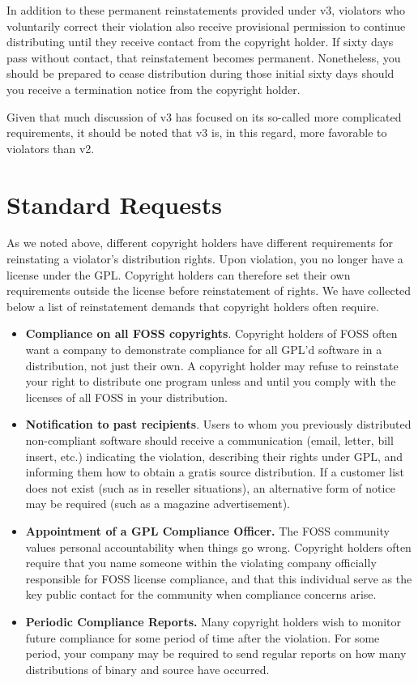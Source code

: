 \documentclass[letterpaper]{fixme}
\begin{document}
In addition to these permanent reinstatements provided under v3, violators
who voluntarily correct their violation also receive provisional
permission to continue distributing until they receive contact from the
copyright holder.  If sixty days pass without contact, that reinstatement
becomes permanent.  Nonetheless, you should be prepared to cease
distribution during those initial sixty days should you receive a
termination notice from the copyright holder.

Given that much discussion of v3 has focused on its so-called more
complicated requirements, it should be noted that v3 is, in this regard,
more favorable to violators than v2.

\section{Standard Requests}

As we noted above, different copyright holders have different requirements
for reinstating a violator's distribution rights.  Upon violation, you no
longer have a license under the GPL\@.  Copyright holders can therefore
set their own requirements outside the license before reinstatement of
rights.  We have collected below a list of reinstatement demands that
copyright holders often require.

\begin{itemize}

\item {\bf Compliance on all FOSS copyrights}.  Copyright holders of FOSS
  often want a company to demonstrate compliance for all GPL'd software in
  a distribution, not just their own.  A copyright holder may refuse to
  reinstate your right to distribute one program unless and until you
  comply with the licenses of all FOSS in your distribution.
 
\item {\bf Notification to past recipients}.  Users to whom you previously
  distributed non-compliant software should receive a communication
  (email, letter, bill insert, etc.) indicating the violation, describing
  their rights under GPL, and informing them how to obtain a gratis source
  distribution.  If a customer list does not exist (such as in reseller
  situations), an alternative form of notice may be required (such as a
  magazine advertisement).

\item {\bf Appointment of a GPL Compliance Officer.}  The FOSS community
  values personal accountability when things go wrong.  Copyright holders
  often require that you name someone within the violating company
  officially responsible for FOSS license compliance, and that this
  individual serve as the key public contact for the community when
  compliance concerns arise.

\item {\bf Periodic Compliance Reports.}  Many copyright holders wish to
  monitor future compliance for some period of time after the violation.
  For some period, your company may be required to send regular reports on
  how many distributions of binary and source have occurred.
\end{itemize}
\end{document}
